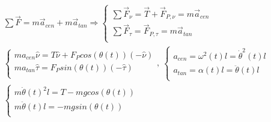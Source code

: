 \documentclass{article}
\numberwithin{equation}{subsection}
\begin{document}
\begin{gather}
    \sum\vec{F}=m\vec{a}_{cen}+m\vec{a}_{tan}\Rightarrow
    \begin{cases}
        \sum\vec{F}_{\nu}=\vec{T}+\vec{F}_{P,\nu}=m\vec{a}_{cen}\\
        \sum\vec{F}_{\tau}=\vec{F}_{P,\tau}=m\vec{a}_{tan}\\
    \end{cases}\\
    \begin{cases}
        ma_{cen}\hat{\nu}=T\hat{\nu}+F_Pcos(\theta(t))(-\hat{\nu})\\
        ma_{tan}\hat{\tau}=F_Psin(\theta(t))(-\hat{\tau})\\
    \end{cases},\:
    \begin{cases}
        a_{cen}=\omega^{2}(t)l=\dot\theta^{2}(t)l\\
        a_{tan}=\alpha(t)l=\ddot\theta(t)l\\
    \end{cases}\\
    \begin{cases}
        m\dot\theta(t)^{2}l=T-mgcos(\theta(t))\\
        m\ddot\theta(t)l=-mgsin(\theta(t))\\
    \end{cases}
\end{gather}
\end{document}
